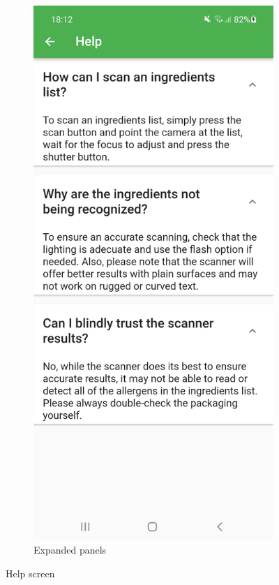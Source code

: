 \begin{figure}[h]
\begin{subfigure}{0.5\textwidth}
        \label{fig:help-collapse}
    \end{subfigure}
    \begin{subfigure}{0.5\textwidth}
        \centering
        \includegraphics[width=0.9\linewidth]{Figures/Screenshot/help.jpg}
        \caption{Expanded panels}
        \label{fig:help}
    \end{subfigure}
    \caption{Help screen}
    \label{fig:help2}
\end{figure}

